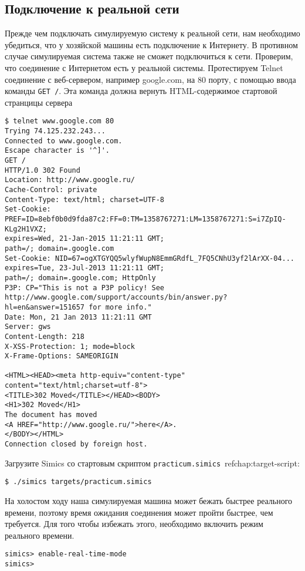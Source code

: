 \subsection{Подключение к реальной сети}

\begin{enumerate*}

\item Прежде чем подключать симулируемую систему к реальной сети, нам необходимо убедиться, что у хозяйской машины есть подключение к Интернету. В противном случае симулируемая система также не сможет подключиться к сети. Проверим, что соединение с Интернетом есть у реальной системы. Протестируем Telnet соединение с веб-сервером, например google.com, на 80 порту, с помощью ввода команды \texttt{GET /}. Эта команда должна вернуть HTML-содержимое стартовой странцицы сервера
\begin{lstlisting}
$ telnet www.google.com 80
Trying 74.125.232.243...
Connected to www.google.com.
Escape character is '^]'.
GET /
HTTP/1.0 302 Found
Location: http://www.google.ru/
Cache-Control: private
Content-Type: text/html; charset=UTF-8
Set-Cookie: PREF=ID=8ebf0b0d9fda87c2:FF=0:TM=1358767271:LM=1358767271:S=i7ZpIQ-KLg2H1VXZ;
expires=Wed, 21-Jan-2015 11:21:11 GMT;
path=/; domain=.google.com
Set-Cookie: NID=67=ogXTGYQQ5wlyfWupN8EmmGRdfL_7FQ5CNhU3yf2lArXX-04...
expires=Tue, 23-Jul-2013 11:21:11 GMT;
path=/; domain=.google.com; HttpOnly
P3P: CP="This is not a P3P policy! See http://www.google.com/support/accounts/bin/answer.py?hl=en&answer=151657 for more info."
Date: Mon, 21 Jan 2013 11:21:11 GMT
Server: gws
Content-Length: 218
X-XSS-Protection: 1; mode=block
X-Frame-Options: SAMEORIGIN

<HTML><HEAD><meta http-equiv="content-type" content="text/html;charset=utf-8">
<TITLE>302 Moved</TITLE></HEAD><BODY>
<H1>302 Moved</H1>
The document has moved
<A HREF="http://www.google.ru/">here</A>.
</BODY></HTML>
Connection closed by foreign host.
\end{lstlisting}

\item Загрузите Simics со стартовым скриптом \texttt{practicum.simics}~ref{chap:target-script}:
\begin{lstlisting}
$ ./simics targets/practicum.simics
\end{lstlisting}

\item На холостом ходу наша симулируемая машина может бежать быстрее реального времени, поэтому время ожидания соединения может пройти быстрее, чем требуется. Для того чтобы избежать этого, необходимо включить режим реального времени.
\begin{lstlisting}
simics> enable-real-time-mode
simics>
\end{lstlisting}


\end{enumerate*}
